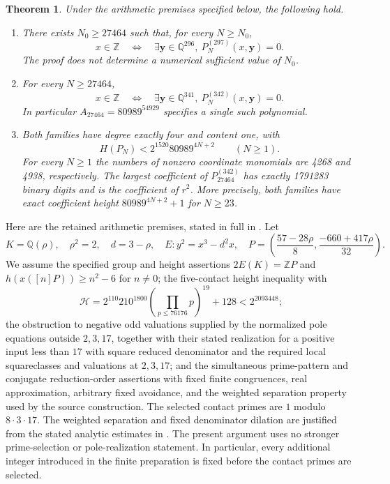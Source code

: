 \documentclass[11pt,a4paper]{article}
\newtheorem{theorem}{Theorem}[section]
\theoremstyle{remark}\newtheorem{remark}[theorem]{Remark}
\newcommand{\Q}{\mathbb Q}\newcommand{\Z}{\mathbb Z}\newcommand{\HH}{\mathcal H}
\begin{document}
\begin{theorem}\label{thm:main}
Under the arithmetic premises specified below, the following hold.
\begin{enumerate}
\item There exists $N_0\ge27464$ such that, for every $N\ge N_0$,
\[
 x\in\Z\quad\Longleftrightarrow\quad
 \exists\boldsymbol y\in\Q^{296},\ P_N^{(297)}(x,\boldsymbol y)=0.
\]
The proof does not determine a numerical sufficient value of $N_0$.
\item For every $N\ge27464$,
\[
 x\in\Z\quad\Longleftrightarrow\quad
 \exists\boldsymbol y\in\Q^{341},\ P_N^{(342)}(x,\boldsymbol y)=0.
\]
In particular $A_{27464}=80989^{54929}$ specifies a single such polynomial.
\item Both families have degree exactly four and content one, with
\[
 H(P_N)<2^{1520}80989^{4N+2}\qquad(N\ge1).
\]
For every $N\ge1$ the numbers of nonzero coordinate monomials are 4268
and 4938, respectively. The largest coefficient of $P_{27464}^{(342)}$
has exactly 1791283 binary digits and is the coefficient of $r^2$.
More precisely, both families have exact coefficient height
$80989^{4N+2}+1$ for $N\ge23$.
\end{enumerate}
\end{theorem}

Here are the retained arithmetic premises, stated in full in
\cite[Section~2]{Source}. Let
\[
 K=\Q(\rho),\quad \rho^2=2,\quad d=3-\rho,\quad
 E:y^2=x^3-d^2x,\quad
 P=\left(\frac{57-28\rho}{8},\frac{-660+417\rho}{32}\right).
\]
We assume the specified group and height assertions
$2E(K)=\Z P$ and $h(x([n]P))\ge n^2-6$ for $n\ne0$;
the five-contact height inequality with
\[
 \HH=2^{110}210^{1800}\left(\prod_{p\le76176}p\right)^{19}+128
 <2^{2093448};
\]
the obstruction to negative odd valuations supplied by the normalized
pole equations outside $2,3,17$, together with their stated realization
for a positive input less than $17$ with square reduced denominator and
the required local squareclasses and valuations at $2,3,17$; and the
simultaneous prime-pattern and conjugate reduction-order assertions with
fixed finite congruences, real approximation, arbitrary fixed avoidance,
and the weighted separation property used by the source construction.
The selected contact primes are $1$ modulo $8\cdot3\cdot17$.
The weighted separation and fixed denominator dilation are justified
from the stated analytic estimates in \cite{Selection}. The present argument
uses no stronger prime-selection or pole-realization statement. In particular, every additional integer introduced in the
finite preparation is fixed before the contact primes are selected.
\end{document}
